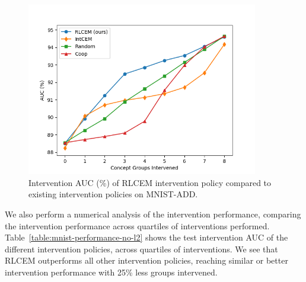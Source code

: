\begin{figure}[!ht]
    \centering
    \includegraphics[width=0.9\textwidth]{figs/evaluation/mnist_rlcem_performance.png}
    \caption{
        Intervention AUC (\%) of RLCEM intervention
    policy compared to existing intervention policies on MNIST-ADD.
    }
    \label{fig:mnist-performance-no-l2}
\end{figure}

We also perform a numerical analysis of the intervention performance,
comparing the intervention performance across quartiles of interventions
performed.
Table~\ref{table:mnist-performance-no-l2} shows the 
test intervention AUC of the different intervention policies, across 
quartiles of interventions.
We see that 
RLCEM outperforms all other intervention policies,
reaching similar or better intervention performance with 25\% less groups
intervened.


